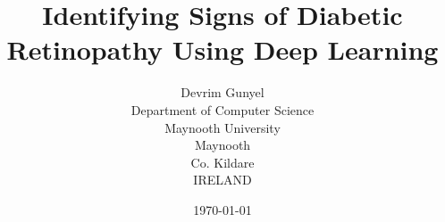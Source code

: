 \documentclass[a4paper,12pt]{report}
\begin{document}
\author{Devrim Gunyel\\
  Department of Computer Science\\
  Maynooth University\\
  Maynooth\\
  Co. Kildare\\
  IRELAND}
\date{\today}
\title{Identifying Signs of Diabetic Retinopathy Using Deep Learning}
\maketitle







\tableofcontents

\newpage





\end{document}
